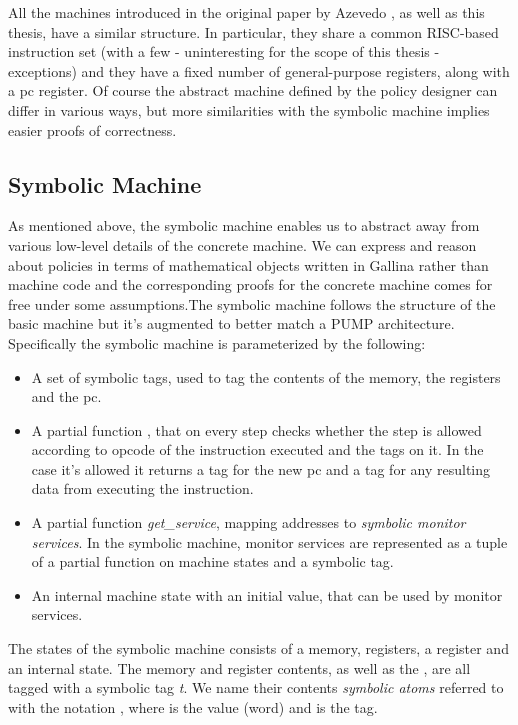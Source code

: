 All the machines introduced in the original paper by Azevedo \ETAL 
\cite{pump_popl2015}, 
as well as this thesis, have a similar structure. In particular, they share a
common RISC-based instruction set (with a few - uninteresting for the scope of
this thesis - exceptions) and they have a fixed number of general-purpose
registers, along with a pc register. Of course the abstract machine defined
by the policy designer can differ in various ways, but more similarities with
the symbolic machine implies easier proofs of correctness.


\subsection{Symbolic Machine}\label{sec:symbolic}

As mentioned above, the symbolic machine enables us to abstract away from 
various low-level details of the concrete machine. We can express and reason
about policies in terms of mathematical objects written in Gallina rather than
machine code and the corresponding proofs for the concrete machine comes for 
free under some assumptions.The symbolic machine follows the structure of the 
basic machine but it's augmented to better match a PUMP architecture. 
Specifically the symbolic machine is parameterized by the following:
\begin{itemize}
\item A set of symbolic tags, used to tag the contents of the memory, the
registers and the pc.
\item A partial function \TRANSFER, that on every step checks whether the
step is allowed according to opcode of the instruction executed and the tags on
it. In the case it's allowed it returns a tag for the new pc and a tag for any 
resulting data from executing the instruction.
\item A partial function \textit{get\_service}, mapping addresses to 
\textit{symbolic monitor services}. In the symbolic machine, monitor services
are represented as a tuple of a partial function on machine states and a
symbolic tag.
\item An internal machine state with an initial value, that can be used by 
monitor services.
\end{itemize}

The states of the symbolic machine consists of a memory, registers, a \pc 
register and an internal state.
The memory  and register contents, as well as the \pc, are all tagged with a
symbolic tag \textit{t}. We name their contents \textit{symbolic atoms} referred
to with the notation , where  is the value (word) and
 is the tag.

